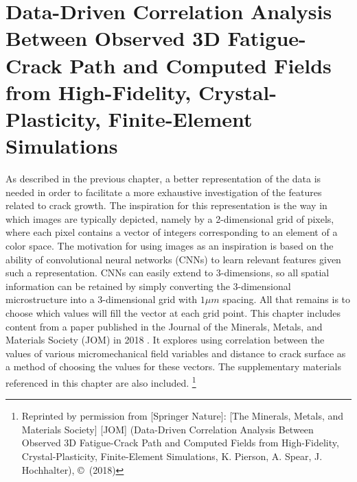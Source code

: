 
\chapter[Data-Driven Correlation Analysis Between Observed 3D\\Fatigue-Crack Path and Computed Fields from High-Fidelity, Crystal-Plasticity, Finite-Element Simulations]{Data-Driven Correlation Analysis Between Observed 3D Fatigue-Crack Path and Computed Fields from High-Fidelity, Crystal-Plasticity, Finite-Element Simulations}

As described in the previous chapter, a better representation of the data is needed in order to facilitate a more exhaustive investigation of the features related to crack growth.  The inspiration for this representation is the way in which images are typically depicted, namely by a 2-dimensional grid of pixels, where each pixel contains a vector of integers corresponding to an element of a color space.  The motivation for using images as an inspiration is based on the ability of convolutional neural networks (CNNs) to learn relevant features given such a representation.  CNNs can easily extend to 3-dimensions, so all spatial information can be retained by simply converting the 3-dimensional microstructure into a 3-dimensional grid with $1 \mu m$ spacing.  All that remains is to choose which values will fill the vector at each grid point.  This chapter includes content from a paper published in the Journal of the Minerals, Metals, and Materials Society (JOM) in 2018 \cite{pierson2018}.  It explores using correlation between the values of various micromechanical field variables and distance to crack surface as a method of choosing the values for these vectors.  The supplementary materials referenced in this chapter are also included. \footnote{Reprinted by permission from [Springer Nature]: [The Minerals, Metals, and Materials Society] [JOM] \cite{pierson2018} (Data-Driven Correlation Analysis Between Observed 3D Fatigue-Crack Path and Computed Fields from High-Fidelity, Crystal-Plasticity, Finite-Element Simulations, K. Pierson, A. Spear, J. Hochhalter), \copyright\ (2018)}




